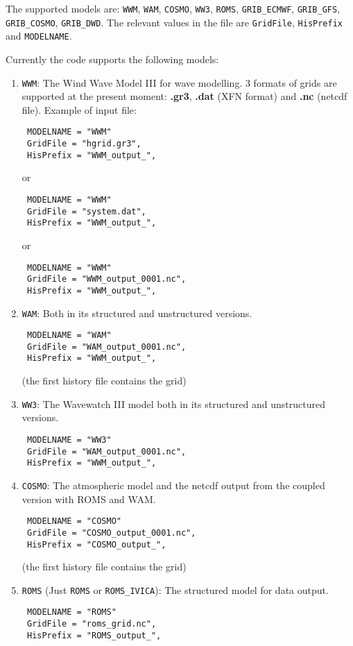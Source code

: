\documentclass[12pt]{amsart}
\begin{document}
The supported models are: {\tt WWM}, {\tt WAM}, {\tt COSMO}, {\tt WW3}, {\tt ROMS}, {\tt GRIB\_ECMWF}, {\tt GRIB\_GFS}, {\tt GRIB\_COSMO}, {\tt GRIB\_DWD}.
The relevant values in the file are {\tt GridFile}, {\tt HisPrefix} and {\tt MODELNAME}.



Currently the code supports the following models:
\begin{enumerate}
\item {\tt WWM}: The Wind Wave Model III for wave modelling. 3 formats of grids are supported at the present moment:
{\bf .gr3}, {\bf .dat} (XFN format) and {\bf .nc} (netcdf file).
Example of input file:
\begin{verbatim}
 MODELNAME = "WWM"
 GridFile = "hgrid.gr3",
 HisPrefix = "WWM_output_",
\end{verbatim}
or 
\begin{verbatim}
 MODELNAME = "WWM"
 GridFile = "system.dat",
 HisPrefix = "WWM_output_",
\end{verbatim}
or
\begin{verbatim}
 MODELNAME = "WWM"
 GridFile = "WWM_output_0001.nc",
 HisPrefix = "WWM_output_",
\end{verbatim}
\item {\tt WAM}: Both in its structured and unstructured versions.
\begin{verbatim}
 MODELNAME = "WAM"
 GridFile = "WAM_output_0001.nc",
 HisPrefix = "WWM_output_",
\end{verbatim}
(the first history file contains the grid)
\item {\tt WW3}: The Wavewatch III model both in its structured and unstructured versions.
\begin{verbatim}
 MODELNAME = "WW3"
 GridFile = "WAM_output_0001.nc",
 HisPrefix = "WWM_output_",
\end{verbatim}
\item {\tt COSMO}: The atmospheric model and the netcdf output from the coupled version with ROMS and WAM.
\begin{verbatim}
 MODELNAME = "COSMO"
 GridFile = "COSMO_output_0001.nc",
 HisPrefix = "COSMO_output_",
\end{verbatim}
(the first history file contains the grid)
\item {\tt ROMS} (Just {\tt ROMS} or {\tt ROMS\_IVICA}): The structured model for data output.
\begin{verbatim}
 MODELNAME = "ROMS"
 GridFile = "roms_grid.nc",
 HisPrefix = "ROMS_output_",
\end{verbatim}

\end{enumerate}
\end{document}
